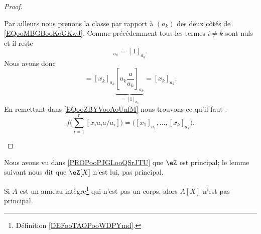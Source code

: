 \begin{proof}
\begin{subproof}
		Par ailleurs nous prenons la classe par rapport à \( (a_k)\) des deux côtés de \eqref{EQooMBGBooKoGKwJ}. Comme précédemment tous les termes \( i\neq k\) sont nuls et il reste
		\begin{equation}
			[u_ka/a_k]_{a_k}=[1]_{a_k}.
		\end{equation}
		Nous avons donc
		\begin{equation}
			[x_ku_k\frac{ a }{ a_k }]=[x_k]_{a_k}\underbrace{[u_k\frac{ a }{ a_k }]_{a_k}}_{=[1]_{a_k}}=[x_k]_{a_k}.
		\end{equation}
		En remettant dans \eqref{EQooZBYVooAoUnfM} nous trouvons ce qu'il faut :
		\begin{equation}
			f\big( \sum_{i=1}^r[x_iu_ia/a_i] \big)=\big( [x_1]_{a_1},\ldots,[x_k]_{a_k} \big).
		\end{equation}
	\end{subproof}
\end{proof}




Nous avons vu dans \ref{PROPooPJGLooQSrJTU} que \( \eZ\) est principal; le lemme suivant nous dit que \( \eZ[X]\) n'est lui, pas principal.
\begin{lemma}        \label{LEMooDJSUooJWyxCL}
	Si \( A\) est un anneau intègre\footnote{Définition \ref{DEFooTAOPooWDPYmd}.} qui n'est pas un corps, alors \( A[X]\) n'est pas principal.
\end{lemma}

